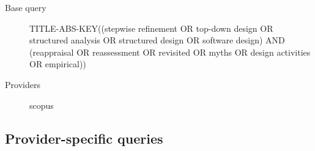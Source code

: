 \documentclass{article}
\begin{document}
\begin{description}
\item[Base query] TITLE-ABS-KEY((\textquotedbl{}stepwise refinement\textquotedbl{} OR \textquotedbl{}top-down design\textquotedbl{} OR \textquotedbl{}structured analysis\textquotedbl{} OR \textquotedbl{}structured design\textquotedbl{} OR \textquotedbl{}software design\textquotedbl{}) AND (reappraisal OR reassessment OR revisited OR myths OR \textquotedbl{}design activities\textquotedbl{} OR empirical))
\item[Providers] scopus
\end{description}

\subsection{Provider-specific queries}
\end{document}
